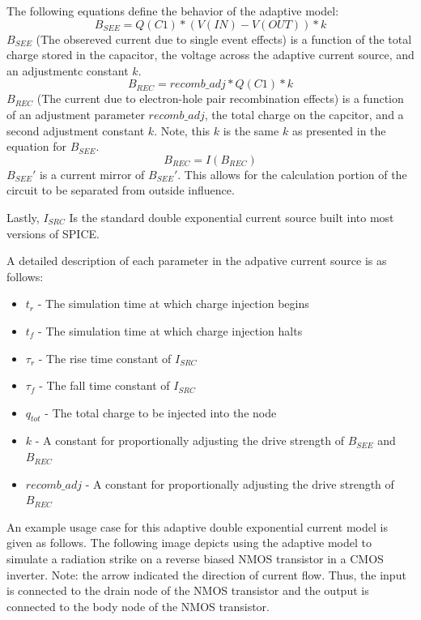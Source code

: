 \documentclass[conference]{IEEEtran}
\begin{document}
The following equations define the behavior of the adaptive model:
{\large
\[B_{SEE}=Q(C1)*(V(IN)-V(OUT))*k\]
}
\(B_{SEE}\) (The obsereved current due to single event effects) is a function of the total charge stored in the capacitor, the voltage across the adaptive current source, and an adjustmentc constant \(k\).
{\large
\[B_{REC}=recomb\_adj*Q(C1)*k\]
}
\(B_{REC}\) (The current due to electron-hole pair recombination effects) is a function of an adjustment parameter \(recomb\_adj\), the total charge on the capcitor, and a second adjustment constant \(k\). Note, this \(k\) is the same \(k\) as presented in the equation for \(B_{SEE}\).
{\large
\[B_{REC}=I(B_{REC})\]
}
\(B_{SEE}'\) is a current mirror of \(B_{SEE}'\). This allows for the calculation portion of the circuit to be separated from outside influence.

Lastly, \(I_{SRC}\) Is the standard double exponential current source built into most versions of SPICE.

A detailed description of each parameter in the adpative current source is as follows:

\begin{itemize}

\item[] \(t_r\) - The simulation time at which charge injection begins

\item[] \(t_f\) - The simulation time at which charge injection halts

\item[] \(\tau_r\) - The rise time constant of \(I_{SRC}\)

\item[] \(\tau_f\) - The fall time constant of \(I_{SRC}\)

\item[] \(q_{tot}\) - The total charge to be injected into the node

\item[] \(k\) - A constant for proportionally adjusting the drive strength of \(B_{SEE}\) and \(B_{REC}\)

\item[] \(recomb\_adj\) - A constant for proportionally adjusting the drive strength of \(B_{REC}\)

\end{itemize}

An example usage case for this adaptive double exponential current model is given as follows. The following image depicts using the adaptive model to simulate a radiation strike on a reverse biased NMOS transistor in a CMOS inverter. Note: the arrow indicated the direction of current flow. Thus, the input is connected to the drain node of the NMOS transistor and the output is connected to the body node of the NMOS transistor.
\end{document}
